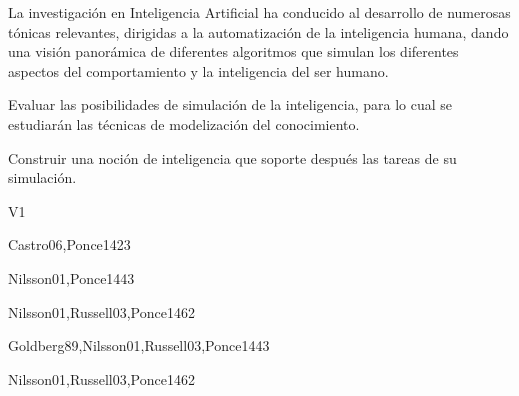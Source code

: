 \begin{syllabus}


\begin{justification}
La investigación en Inteligencia Artificial ha conducido al desarrollo de
numerosas tónicas relevantes, dirigidas a la automatización de la
inteligencia humana, dando una visión panorámica de diferentes
algoritmos que simulan los diferentes aspectos del comportamiento
y la inteligencia del ser humano.
\end{justification}

\begin{goals}
\item Evaluar las posibilidades de simulación de la inteligencia, para lo cual se estudiarán las técnicas de modelización del conocimiento.
\item Construir una noción de inteligencia que soporte después las tareas de su simulación.
\end{goals}

\begin{outcomes}{V1}
\end{outcomes}

\begin{unit}{\ISFundamentalIssuesDef}{}{Castro06,Ponce14}{2}{3}
    \ISFundamentalIssuesAllTopics
    \ISFundamentalIssuesAllObjectives
\end{unit}

\begin{unit}{\ISBasicSearchStrategiesDef}{}{Nilsson01,Ponce14}{4}{3}
    \ISBasicSearchStrategiesAllTopics
    \ISBasicSearchStrategiesAllObjectives
\end{unit}

\begin{unit}{\ISKnowledgementBasedReasoningDef}{}{Nilsson01,Russell03,Ponce14}{6}{2}
    \ISKnowledgementBasedReasoningAllTopics
    \ISKnowledgementBasedReasoningAllObjectives
\end{unit}

\begin{unit}{\ISAdvancedSearchDef}{}{Goldberg89,Nilsson01,Russell03,Ponce14}{4}{3}
     \ISAdvancedSearchAllTopics
     \ISAdvancedSearchAllObjectives
\end{unit}

\begin{unit}{\ISAdvancedReasoningDef}{}{Nilsson01,Russell03,Ponce14}{6}{2}
    \ISAdvancedReasoningAllTopics
    \ISAdvancedReasoningAllObjectives
\end{unit}


\end{syllabus}
